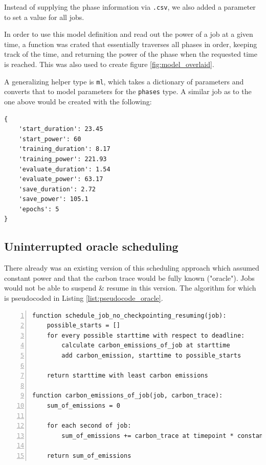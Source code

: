 Instead of supplying the phase information via \verb|.csv|, we also added a parameter to set a value for all jobs.

In order to use this model definition and read out the power of a job at a given time, a function was crated that essentially traverses all phases in order, keeping track of the time, and returning the power of the phase when the requested time is reached. 
This was also used to create figure \ref{fig:model_overlaid}.

A generalizing helper type is \verb|ml|, which takes a dictionary of parameters and converts that to model parameters for the \verb|phases| type. A similar job as to the one above would be created with the following:

\begin{lstlisting}[frame=single, numbers=none, caption={Generic model definition for machine learning jobs}, label={list:roberta_model_definition_generic}, basicstyle=\ttfamily]
{
    'start_duration': 23.45
    'start_power': 60
    'training_duration': 8.17
    'training_power': 221.93
    'evaluate_duration': 1.54
    'evaluate_power': 63.17
    'save_duration': 2.72
    'save_power': 105.1
    'epochs': 5
}
\end{lstlisting}

\subsection{Uninterrupted oracle scheduling} \label{sec:uninterrupted_oracle_scheduling}

There already was an existing version of this scheduling approach which assumed constant power and that the carbon trace would be fully known ("oracle"). 
Jobs would not be able to suspend \& resume in this version.
The algorithm for which is pseudocoded in Listing \ref{list:pseudocode_oracle}.

\begin{lstlisting}[frame=single, numbers=left, caption={Pseudocode for the original non-interrupt oracle scheduler}, label={list:pseudocode_oracle}, basicstyle=\ttfamily]
function schedule_job_no_checkpointing_resuming(job):
    possible_starts = []
    for every possible starttime with respect to deadline:
        calculate carbon_emissions_of_job at starttime
        add carbon_emission, starttime to possible_starts
    
    return starttime with least carbon emissions

function carbon_emissions_of_job(job, carbon_trace):
    sum_of_emissions = 0

    for each second of job:
        sum_of_emissions += carbon_trace at timepoint * constant_watt
    
    return sum_of_emissions
\end{lstlisting}

